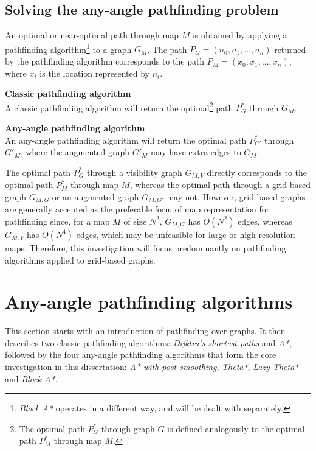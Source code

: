 \documentclass[12pt,notitlepage]{report}
\begin{document}
\subsection{Solving the any-angle pathfinding problem}

\noindent
An optimal or near-optimal path through map $M$ is obtained by applying a pathfinding algorithm\footnote{{\em Block A*} operates in a different way, and will be dealt with separately.} to a graph $G_{M}$. The path $P_{G} = (n_{0},n_{1},...,n_{n})$  returned by the pathfinding algorithm corresponds to the path $P_{M} = (x_{0},x_{1},...,x_{n})$, where $x_{i}$ is the location represented by $n_{i}$.

\begin{description}
\item{\bfseries Classic pathfinding algorithm}\\ 
A classic pathfinding algorithm will return the optimal\footnote{The optimal path $P^{*}_{G}$ through graph $G$ is defined analogously to the optimal path $P^{*}_{M}$ through map $M$.} path $P^{*}_{G}$ through $G_{M}$.
\item{\bfseries Any-angle pathfinding algorithm}\\
An any-angle pathfinding algorithm will return the optimal path $P^{*}_{G'}$ through $G'_{M}$, where the augmented graph $G'_{M}$ may have extra edges to $G_{M}$.
\end{description}

\noindent
The optimal path $P^{*}_{G}$ through a visibility graph $G_{M,V}$ directly corresponds to the optimal path $P^{*}_{M}$ through map $M$, whereas the optimal path through a grid-based graph $G_{M,G}$ or an augmented graph $G_{M,G'}$ may not. However, grid-based graphs are generally accepted as the preferable form of map representation for pathfinding since, for a map $M$ of size $N^{2}$, $G_{M,G}$ has {$O(N^{2})$} edges, whereas $G_{M,V}$ has {$O(N^{4})$} edges, which may be unfeasible for large or high resolution maps. Therefore, this investigation will focus predominantly on pathfinding algorithms applied to grid-based graphs.\\

\newpage
\section{Any-angle pathfinding algorithms}

\noindent
This section starts with an introduction of pathfinding over graphs. It then describes two classic pathfinding algorithms: {\em Dijktra's shortest paths}\cite{Dij59} and {\em A*}\cite{Hart68}, followed by the four any-angle pathfinding algorithms that form the core investigation in this dissertation: {\em A* with post smoothing}, {\em Theta*}, {\em Lazy Theta*} and {\em Block A*}.
\end{document}
